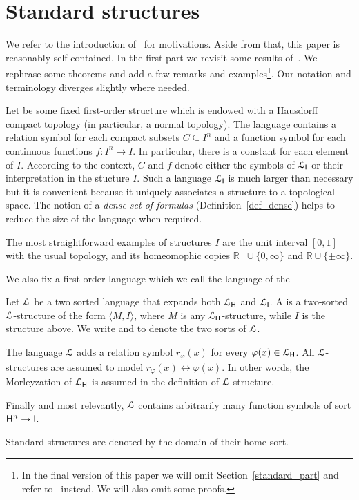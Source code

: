 \documentclass[10pt,oneside]{amsproc}
\renewcommand*{\emph}[1]{%
   \smash{\tikz[baseline]\node[rectangle, fill=teal!25, rounded corners, inner xsep=0.5ex, inner ysep=0.2ex, anchor=base, minimum height = 2.7ex]{\strut #1};}}
\begin{document}
\section{Standard structures}\label{uno}


We refer to the introduction of~\cite{clcl} for motivations.
Aside from that, this paper is reasonably self-contained.
In the first part we revisit some results of~\cite{clcl}.
We rephrase some theorems and add a few remarks and examples\footnote{In the final version of this paper we will omit Section~\ref{standard_part} and refer to~\cite{clcl} instead. We will also omit some proofs.}.
Our notation and terminology diverges slightly where needed.

\def\ceq#1#2#3{\parbox[t]{23ex}{$\displaystyle #1$}\parbox{6ex}{\hfil $#2$}{$\displaystyle #3$}}

Let \emph{$I$\/} be some fixed first-order structure which is endowed with a Hausdorff compact topology (in particular, a normal topology).
The language \emph{${\EuScript L}_{\sf I}$\/} contains a relation symbol for each compact subsets $C\subseteq I^n$ and a function symbol for each continuous functions $f:I^n\to I$.
In particular, there is a constant for each element of $I$.
According to the context, $C$ and $f$ denote either the symbols of ${\EuScript L}_{\sf I}$ or their interpretation in the stucture $I$.
Such a language ${\EuScript L}_{\sf I}$ is much larger than necessary but it is convenient because it uniquely associates a structure to a topological space.
The notion of a \textit{dense set of formulas\/} (Definition~\ref{def_dense}) helps to reduce the size of the language when required.

The most straightforward examples of structures $I$ are the unit interval $[0,1]$ with the usual topology, and its homeomophic copies $\mathds{R}^+\cup\{0,\infty\}$ and $\mathds{R}\cup\{\pm\infty\}$.

We also fix a first-order language \emph{${\EuScript L}_{\sf H}$\/} which we call the language of the \emph{home sort.}

\begin{definition}\label{def_0}
  Let ${\EuScript L}$ be a two sorted language that expands both ${\EuScript L}_{\sf H}$ and ${\EuScript L}_{\sf I}$.
  A \emph{standard structure\/} is a two-sorted ${\EuScript L}$-structure of the form $\langle M,I\rangle$, where $M$ is any ${\EuScript L}_{\sf H}$-structure, while $I$ is the structure above.
  We write \emph{${\sf H}$} and \emph{${\sf I}$\/} to denote the two sorts of ${\EuScript L}$.
  
  The language ${\EuScript L}$ adds a relation symbol $r_{\varphi}(x)$ for every $\varphi(x)\in {\EuScript L}_{\sf H}$.
  All ${\EuScript L}$-structures are assumed to model $r_{\varphi}(x)\leftrightarrow\varphi(x)$. 
  In other words, the Morleyzation of ${\EuScript L}_{\sf H}$ is assumed in the definition of ${\EuScript L}$-structure.
  
  Finally and most relevantly, ${\EuScript L}$ contains arbitrarily many function symbols of sort ${\sf H}^n\to {\sf I}$.

  Standard structures are denoted by the domain of their home sort.
\end{definition}
\end{document}
